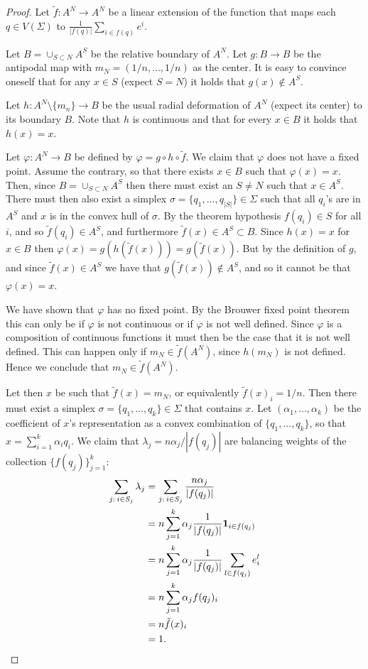 \documentclass[11pt]{article} \usepackage{amssymb}
\renewcommand{\phi}{\varphi}
\begin{document}
\begin{proof}
  Let $\tilde{f}:A^N \to A^N$ be a linear extension of the function
  that maps each $q \in V(\Sigma)$ to $\frac{1}{|f(q)|}\sum_{i \in
    f(q)}e^i$.
  
  Let $B=\cup_{S \subset N}A^S$ be the relative boundary of $A^N$. Let
  $g:B \to B$ be the antipodal map with $m_N=(1/n,\ldots,1/n)$ as the
  center. It is easy to convince oneself that for any $x \in S$
  (expect $S=N$) it holds that $g(x) \not \in A^S$.

  Let $h : A^N \setminus \{m_n\} \to B$ be the usual radial
  deformation of $A^N$ (expect its center) to its boundary $B$. Note
  that $h$ is continuous and that for every $x \in B$ it holds that
  $h(x) = x$.

  Let $\phi : A^N \to B$ be defined by $\phi = g \circ h \circ
  \tilde{f}$. We claim that $\phi$ does not have a fixed point. Assume
  the contrary, so that there exists $x\in B$ such that
  $\phi(x)=x$. Then, since $B=\cup_{S \subset N}A^S$ then there must
  exist an $S \neq N$ such that $x \in A^S$. There must then also
  exist a simplex $\sigma = \{q_1, \ldots, q_{|S|}\} \in \Sigma$ such
  that all $q_i$'s are in $A^S$ and $x$ is in the convex hull of
  $\sigma$. By the theorem hypothesis $f(q_i) \in S$ for all $i$, and
  so $\tilde{f}(q_i) \in A^S$, and furthermore $\tilde{f}(x) \in A^S
  \subset B$. Since $h(x) = x$ for $x \in B$ then $\phi(x) =
  g(h(\tilde{f}(x)))= g(\tilde{f}(x))$. But by the definition of $g$,
  and since $\tilde{f}(x) \in A^S$ we have that $g(\tilde{f}(x)) \not
  \in A^S$, and so it cannot be that $\phi(x)=x$.

  We have shown that $\phi$ has no fixed point. By the Brouwer fixed
  point theorem this can only be if $\phi$ is not continuous or if
  $\phi$ is not well defined. Since $\phi$ is a composition of
  continuous functions it must then be the case that it is not well
  defined. This can happen only if $m_N \in \tilde{f}(A^N)$, since
  $h(m_N)$ is not defined. Hence we conclude that $m_N \in
  \tilde{f}(A^N)$.

  Let then $x$ be such that $\tilde{f}(x) = m_N$, or equivalently
  $\tilde{f}(x)_i=1/n$. Then there must exist a simplex $\sigma =
  \{q_1, \ldots, q_k\} \in \Sigma$ that contains $x$.  Let $(\alpha_1,
  \ldots, \alpha_k)$ be the coefficient of $x$'s representation as a
  convex combination of $\{q_1,\ldots,q_k\}$, so that
  $x=\sum_{i=1}^k\alpha_iq_i$. We claim that $\lambda_j =
  n\alpha_j/|f(q_j)|$ are balancing weights of the collection
  $\{f(q_j)\}_{j=1}^k$:
  \begin{align*}
    \sum_{j :\: i \in S_j}\lambda_j &=
    \sum_{j :\: i \in S_j}\frac{n\alpha_j}{|f(q_j)|}
    \\ &= n\sum_{j=1}^k\alpha_j\frac{1}{|f(q_j)|}{\bf 1}_{i \in f(q_j)}
    \\ &= n\sum_{j=1}^k\alpha_j\frac{1}{|f(q_j)|}\sum_{l \in f(q_j)}e^l_i
    \\ &= n\sum_{j=1}^k\alpha_jf(q_j)_i
    \\ &= n\tilde{f}(x)_i
    \\ &= 1.
  \end{align*}
\end{proof}
\end{document}
